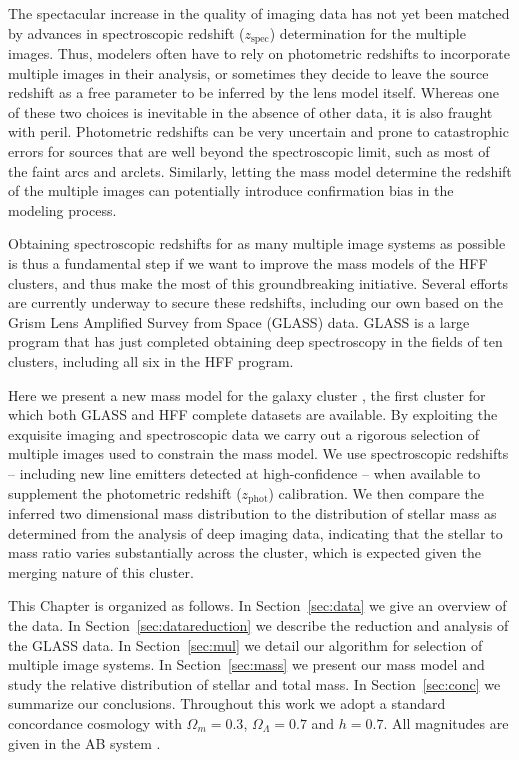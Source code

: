 The spectacular increase in the quality of imaging data has
not yet been matched by advances in spectroscopic redshift ($z_{\textrm{spec}}$)
determination for the multiple images. Thus, modelers often have to
rely on photometric redshifts to incorporate multiple images in their
analysis, or sometimes they decide to leave the source redshift as a
free parameter to be inferred by the lens model itself. Whereas one
of these two choices is inevitable in the absence of other data, it is
also fraught with peril. Photometric redshifts can be very uncertain
and prone to catastrophic errors for sources that are well beyond the
spectroscopic limit, such as most of the faint arcs and
arclets. Similarly, letting the mass model determine the redshift of
the multiple images can potentially introduce confirmation bias in the
modeling process.

Obtaining spectroscopic redshifts for as many multiple image systems
as possible is thus a fundamental step if we want to improve the mass
models of the HFF clusters, and thus make the most of this
groundbreaking initiative. Several efforts are currently underway to
secure these redshifts, including our own based on the Grism Lens
Amplified Survey from Space (GLASS) data.
GLASS is a large \hst program that has just completed obtaining deep spectroscopy in the fields of ten clusters,
including all six in the HFF program.

Here we present a new mass model for the galaxy cluster
\cler, the first cluster for which both GLASS and HFF complete
datasets are available. By exploiting the exquisite imaging and
spectroscopic data we carry out a rigorous selection of multiple
images used to constrain the mass model. We use spectroscopic redshifts
-- including \NELobjsQhi new line emitters detected at high-confidence -- when available to supplement the
photometric redshift ($z_{\textrm{phot}}$) calibration. We then compare the inferred two
dimensional mass distribution to the distribution of stellar mass as
determined from the analysis of deep \spitzer imaging data, indicating that the stellar to mass ratio
varies substantially across the cluster, which is expected given the merging nature of this cluster. 

This Chapter is organized as follows. In Section~\ref{sec:data} we give
an overview of the data. In Section~\ref{sec:datareduction} we
describe the reduction and analysis of the GLASS data. In
Section~\ref{sec:mul} we detail our algorithm for selection of
multiple image systems. In Section~\ref{sec:mass} we present our mass
model and study the relative distribution of stellar and total mass. In
Section~\ref{sec:conc} we summarize our conclusions. Throughout this
work we adopt a standard concordance cosmology with $\Omega_m=0.3$,
$\Omega_{\Lambda}=0.7$ and $h=0.7$. All magnitudes are given in the AB
system \citep{Oke74}.


